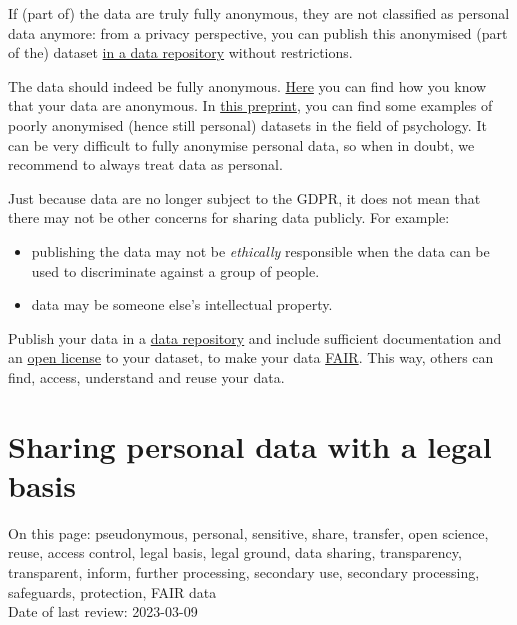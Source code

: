 \documentclass[
]{book}
\providecommand{\tightlist}{%
  \setlength{\itemsep}{0pt}\setlength{\parskip}{0pt}}
\begin{document}
If (part of) the data are truly fully anonymous, they are not classified as
personal data anymore: from a privacy perspective, you can publish this
anonymised (part of the) dataset
\href{https://www.uu.nl/en/research/research-data-management/guides/publishing-and-sharing-data}{in a data repository}
without restrictions.

The data should indeed be fully anonymous.
\protect\hyperlink{pseudonymisation-anonymisation}{Here} you can find how you know that your data
are anonymous. In
\href{https://doi.org/10.31234/osf.io/ybzu9}{this preprint}, you
can find some examples of poorly anonymised (hence still personal) datasets in
the field of psychology. It can be very difficult to fully anonymise personal
data, so when in doubt, we recommend to always treat data as personal.

Just because data are no longer subject to the GDPR, it does not mean that there
may not be other concerns for sharing data publicly. For example:

\begin{itemize}
\tightlist
\item
  publishing the data may not be \emph{ethically} responsible when the data can be
  used to discriminate against a group of people.
\item
  data may be someone else's intellectual property.
\end{itemize}

Publish your data in a
\href{https://tools.uu.nl/repository-decision-tool/}{data repository}
and include sufficient documentation and an
\href{https://www.uu.nl/en/research/research-data-management/guides/publishing-and-sharing-data}{open license}
to your dataset, to make your data
\href{https://www.uu.nl/en/research/research-data-management/guides/how-to-make-your-data-fair}{FAIR}.
This way, others can find, access, understand and reuse your data.

\hypertarget{share-reuse-legal-basis}{%
\section{Sharing personal data with a legal basis}\label{share-reuse-legal-basis}}

On this page: pseudonymous, personal, sensitive, share, transfer, open science,
reuse, access control, legal basis, legal ground, data sharing, transparency,
transparent, inform, further processing, secondary use, secondary processing,
safeguards, protection, FAIR data\\
Date of last review: 2023-03-09
\end{document}
